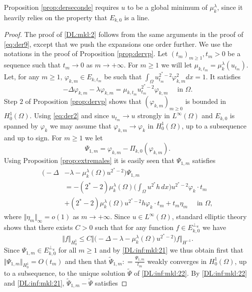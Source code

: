 \documentclass[10pt]{amsart}
\numberwithin{equation}{section}
\newcommand{\vp}{\varphi}
\newcommand{\Om}{\Omega}
\newcommand{\mkl}{\mu_{k}^{\lambda}}
\theoremstyle{plain}
\theoremstyle{remark}
\begin{document}
Proposition \ref{prop:derseconde} requires $u$ to be a global minimum of $\mkl$, since it heavily relies on the property that $E_{k,0}$ is a line. 


\begin{proof}
The proof of \eqref{DL:mkl:2} follows from the same arguments in the proof of \eqref{eq:der9}, except that we push the expansions one order further. We use the notations in the proof of Proposition \ref{prop:dervp}. Let $(t_m)_{m \ge1}, t_m >0$ be a sequence such that $t_m \to 0$ as $m \to + \infty $. For $m \ge 1$ we will let $\mu_{k,t_m} = \mu_k^{\lambda}(u_{t_m})$. Let, for any $m \ge 1$, $\vp_{k,m} \in E_{k,t_m}$ be such that $\int_\Om u_{t_m}^{2^*-2} \vp_{k,m}^2dx = 1$. It satisfies 
$$  - \Delta \vp_{k,m} - \lambda \vp_{k,m} = \mu_{k,t_m} u_{t_m}^{2^*-2} \vp_{k,m} \quad \text{ in } \Om. $$
Step $2$ of Proposition \ref{prop:dervp} shows that $(\vp_{k,m})_{m\ge0}$ is bounded in $H^1_0(\Om)$. Using  \eqref{eq:der2} and since $u_{t_m} \to u$ strongly in $L^{\infty}(\Om)$ and $E_{k,0}$ is spanned by $\vp_k$ we may assume that $\vp_{k,m} \to \vp_k$ in $H^1_0(\Om)$, up to a subsequence and up to sign. For $m \ge 1$ we let 
$$\Psi_{1,m} = \vp_{k,m} - \Pi_{k,0}(\vp_{k,m}).$$
 Using Proposition \ref{prop:extremales} it is easily seen that $\Psi_{1,m}$ satisfies
\begin{equation} \label{DL:inf:mkl:21}
\begin{aligned}
\big( - \Delta &- \lambda - \mkl(\Om) u^{2^*-2} \big)\Psi_{1,m} \\
&  =- (2^*-2) \mkl(\Om) \Big( \int_{\Om} u^{2^*}h \, dx\Big) u^{2^*-2} \vp_k  \cdot t_m \\
& + (2^*-2) \mkl(\Om) u^{2^*-2}h \vp_k \cdot t_m + t_m \eta_m \quad \text{ in } \Om,
\end{aligned} 
\end{equation}
where $\Vert \eta_m \Vert_{\infty} = o(1)$ as $m \to + \infty$. Since $u \in L^\infty(\Om)$, standard elliptic theory shows that there exists $C>0$ such that for any function $f \in E_{k,0}^{\perp_u}$ we have
\begin{equation} \label{DL:inf:mkl:210} 
\Vert f \Vert_{H^1_0} \le C \Vert \big( - \Delta - \lambda - \mkl(\Om) u^{2^*-2} \big)f  \Vert_{H^{-1}}. 
\end{equation}
Since $\Psi_{1,m} \in E_{k,0}^{\perp_{u}}$ for all $m \ge 1$ and by \eqref{DL:inf:mkl:21} we thus obtain first that $\Vert \Psi_{1,m} \Vert_{H^1_0} = O(t_m) $ and then that 
$\tilde{\Psi}_{1,m}: = \frac{\Psi_{1,m}}{t_m}$ weakly converges in $H^1_0(\Om)$, up to a subsequence, to the unique solution $\tilde{\Psi}$ of \eqref{DL:inf:mkl:22}. By \eqref{DL:inf:mkl:22} and  \eqref{DL:inf:mkl:21}, $\tilde{\Psi}_{1,m} - \tilde{\Psi}$ satisfies 

\end{proof}
\end{document}
